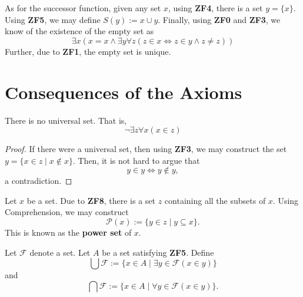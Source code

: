As for the successor function, given any set $x$, using \textbf{ZF4}, there is a set $y = \{x\}$. Using \textbf{ZF5}, we may define $S(y) := x\cup y$. Finally, using \textbf{ZF0} and \textbf{ZF3}, we know of the existence of the empty set as 
\begin{equation*}
    \exists x(x = x\wedge\exists y\forall z(z\in x\Longleftrightarrow z\in y\wedge z\ne z))
\end{equation*}
Further, due to \textbf{ZF1}, the empty set is unique.

\section{Consequences of the Axioms}

\begin{theorem}
    There is no universal set. That is, 
    \begin{equation*}
        \neg\exists z\forall x(x\in z)
    \end{equation*}
\end{theorem}
\begin{proof}
If there were a universal set, then using \textbf{ZF3}, we may construct the set $y = \{x\in z\mid x\notin x\}$. Then, it is not hard to argue that 
\begin{equation*}
    y\in y\iff y\notin y,
\end{equation*}
a contradiction.
\end{proof}

\begin{definition}
    Let $x$ be a set. Due to \textbf{ZF8}, there is a set $z$ containing all the subsets of $x$. Using Comprehension, we may construct
    \begin{equation*}
        \mathscr P(x) := \{y\in z\mid y\subseteq x\}.
    \end{equation*}
    This is known as the \textbf{power set} of $x$.
\end{definition}

\begin{definition}
    Let $\mathscr F$ denote a set. Let $A$ be a set satisfying \textbf{ZF5}. Define 
    \begin{equation*}
        \bigcup\mathscr F := \{x\in A\mid\exists y\in\mathscr F(x\in y)\}
    \end{equation*}
    and 
    \begin{equation*}
        \bigcap\mathscr F := \{x\in A\mid\forall y\in\mathscr F(x\in y)\}.
    \end{equation*}
\end{definition}

